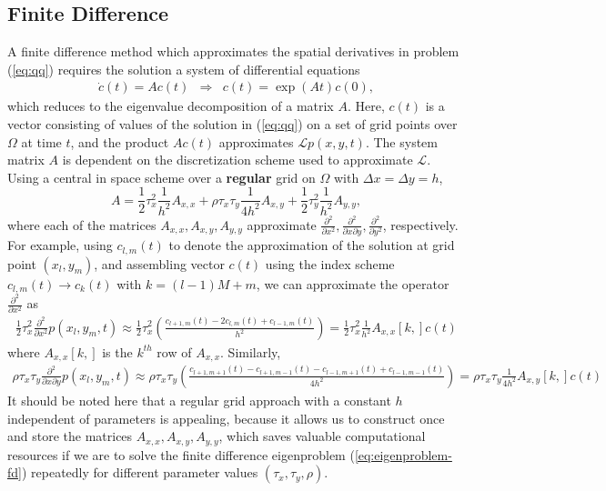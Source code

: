 \documentclass[10pt]{article}
\begin{document}
\subsection{Finite Difference} \label{sec:finite-difference} A finite
difference method which approximates the spatial derivatives in
problem (\ref{eq:qq}) requires the solution a system of differential
equations
\begin{align}
  \dot{c}(t)= A c(t) &\Rightarrow& c(t) = \exp\left( At \right)c(0) \label{eq:eigenproblem-fd}, 
\end{align}
which reduces to the eigenvalue decomposition of a matrix $A$. Here,
$c(t)$ is a vector consisting of values of the solution in
(\ref{eq:qq}) on a set of grid points over $\Omega$ at time $t$, and
the product $Ac(t)$ approximates $\mathcal{L}p(x,y,t)$. The system
matrix $A$ is dependent on the discretization scheme used to
approximate $\mathcal{L}$. Using a central in space scheme over a
\textbf{regular} grid on $\Omega$ with $\Delta x = \Delta y = h$,
\[ A = \frac{1}{2}\tau_x^2 \frac{1}{h^2}A_{x,x} +
  \rho\tau_x\tau_y \frac{1}{4h^2}A_{x,y} + \frac{1}{2}\tau_y^2
  \frac{1}{h^2}A_{y,y},
\]
where each of the matrices $A_{x,x}, A_{x,y}, A_{y,y}$ approximate
$\frac{\partial^2}{\partial x^2}, \frac{\partial^2}{\partial
  x \partial y}, \frac{\partial^2}{\partial y^2}$, respectively. For
example, using $c_{l, m}(t) $ to denote the approximation of the
solution at grid point $(x_l, y_m)$, and assembling vector $c(t)$
using the index scheme $c_{l, m}(t) \rightarrow c_k(t)$ with
$k= (l-1) M + m$, we can approximate the operator
$\frac{\partial^2 }{\partial x^2} $ as
\begin{align*}
  \frac{1}{2}\tau_x^2 \frac{\partial^2}{\partial x^2} p(x_l,y_m,t) \approx \frac{1}{2}\tau_x^2 \left( \frac{c_{l+1,m}(t) - 2c_{l,m}(t) + c_{l-1,m}(t)}{h^2} \right) = \frac{1}{2}\tau_x^2 \frac{1}{h^2}A_{x,x}[k,] c(t) 
\end{align*}
where $A_{x,x}[k,]$ is the $k^{th}$ row of $A_{x,x}$. Similarly,
\begin{align*}
  \rho\tau_x\tau_y \frac{\partial^2}{\partial x \partial y} p(x_l,y_m,t) \approx \rho\tau_x\tau_y \left( \frac{c_{l+1,m+1}(t) - c_{l+1,m-1}(t) - c_{l-1,m+1}(t) + c_{l-1,m-1}(t)}{4h^2} \right) = \rho\tau_x\tau_y \frac{1}{4h^2}A_{x,y}[k,] c(t) 
\end{align*}
It should be noted here that a regular grid approach with a constant
$h$ independent of parameters is appealing, because it allows us to
construct once and store the matrices $A_{x,x}, A_{x,y}, A_{y,y}$,
which saves valuable computational resources if we are to solve the
finite difference eigenproblem (\ref{eq:eigenproblem-fd}) repeatedly
for different parameter values $(\tau_x,\tau_y,\rho)$.
\end{document}
